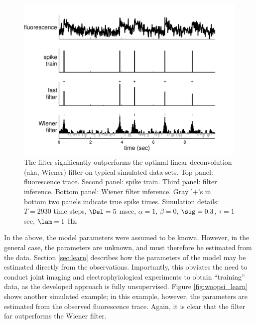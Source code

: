 \begin{figure}[h!]
\centering \includegraphics[width=.9\linewidth]{../figs/woopsi_inf}
\caption{The \foopsi filter significantly outperforms the optimal linear deconvolution (aka, Wiener) filter on typical simulated data-sets. Top panel: fluorescence trace.  Second panel: spike train.  Third panel: \foopsi filter inference.  Bottom panel: Wiener filter inference.  Gray '$+$'s in bottom two panels indicate true spike times.  Simulation details: $T=2930$ time steps, $\Del=5$ msec, $\alpha=1$, $\beta=0$, $\sig=0.3$, $\tau=1$ sec, $\lam=1$ Hz.} \label{fig:woopsi_inf}
\end{figure}


In the above, the model parameters were assumed to be known.  However, in the general case, the parameters are unknown, and must therefore be estimated from the data.  Section \ref{sec:learn} describes how the parameters of the model may be estimated directly from the observations.  Importantly, this obviates the need to conduct joint imaging and electrophyiological experiments to obtain ``training'' data, as the developed approach is fully unsupervised.  Figure \ref{fig:woopsi_learn} shows another simulated example; in this example, however, the parameters are estimated from the observed fluorescence trace.  Again, it is clear that the \foopsi filter far outperforms the Wiener filter.

